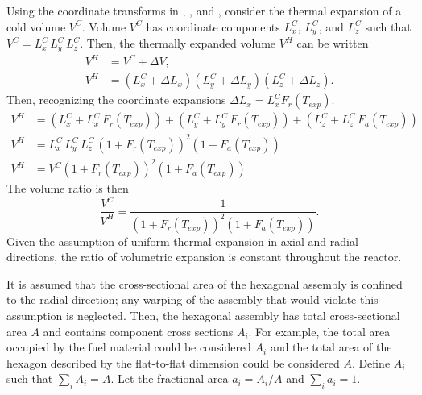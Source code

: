   Using the coordinate transforms in , , and
  , consider the thermal expansion of a cold volume $V^C$.
  Volume $V^C$ has coordinate components $L_x^C$, $L_y^C$, and $L_z^C$ such that 
  ${V^C = L_x^C \, L_y^C \, L_z^C}$. Then, the thermally expanded volume $V^H$ 
  can be written
  \begin{align}
    V^H &= V^C + \Delta V, \\
    V^H &= (L_x^C + \Delta L_x) (L_y^C + \Delta L_y) (L_z^C + \Delta L_z). 
  \end{align}
  Then, recognizing the coordinate expansions 
  ${\Delta L_x = L_x^C F_r(T_{exp})}$.
  \begin{align}
    V^H &= (L_x^C + L_x^C \, F_r(T_{exp})) + (L_y^C + L_y^C \, F_r(T_{exp})) + 
      (L_z^C + L_z^C \, F_a(T_{exp})) \\
    V^H &= L_x^C \, L_y^C \, L_z^C \, (1 + F_r(T_{exp}))^2 (1+F_a(T_{exp})) \\
    V^H &= V^C (1 + F_r(T_{exp}))^2 (1+F_a(T_{exp}))
  \end{align}
  The volume ratio is then
  \begin{equation}
    \label{eq:volume_ratio}
    \frac{V^C}{V^H} = \frac{1}{(1+F_r(T_{exp}))^2 (1+F_a(T_{exp}))}.
  \end{equation}
  Given the assumption of uniform thermal expansion in axial and radial
  directions, the ratio of volumetric expansion is constant throughout the
  reactor.

  It is assumed that the cross-sectional area of the hexagonal assembly is 
  confined to the radial direction; any warping of the assembly that would
  violate this assumption is neglected. Then, the hexagonal assembly has total
  cross-sectional area $A$ and contains component cross sections $A_i$. For
  example, the total area occupied by the fuel material could be considered
  $A_i$ and the total area of the hexagon described by the flat-to-flat
  dimension could be considered $A$. Define $A_i$ such that $\sum_{i} A_i = A$.
  Let the fractional area $a_i = A_i/A$ and $\sum_{i} a_i = 1$.

